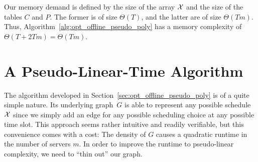 Our memory demand is defined by the size of the array $\mathcal{X}$ and the size of the tables $C$ and $P$. The former is of size $\Theta(T)$, and the latter are of size $\Theta(Tm)$. Thus, Algorithm~\ref{alg:opt_offline_pseudo_poly} has a memory complexity of $\Theta(T+2Tm)=\Theta(Tm)$.

\section{A Pseudo-Linear-Time Algorithm}\label{sec:opt_offline_pseudo_lin}
The algorithm developed in Section~\ref{sec:opt_offline_pseudo_poly} is of a quite simple nature. Its underlying graph~$G$ is able to represent any possible schedule $\mathcal{X}$ since we simply add an edge for any possible scheduling choice at any possible time slot. This approach seems rather intuitive and readily verifiable, but this convenience comes with a cost: The density of $G$ causes a quadratic runtime in the number of servers $m$. In order to improve the runtime to pseudo-linear complexity, we need to ``thin out'' our graph. 

